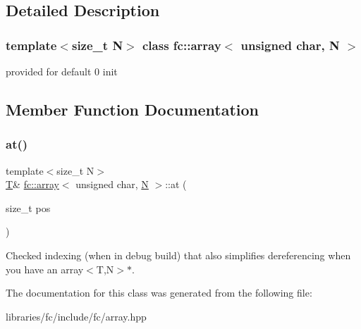 \subsection{Detailed Description}
\subsubsection*{template$<$size\+\_\+t N$>$\newline
class fc\+::array$<$ unsigned char, N $>$}

provided for default 0 init 

\subsection{Member Function Documentation}
\mbox{\label{classfc_1_1array_3_01unsigned_01char_00_01_n_01_4_ad86f8f8464a2c04c87fa1ea790e9f5db}} 
\subsubsection{\texorpdfstring{at()}{at()}}
{\footnotesize\ttfamily template$<$size\+\_\+t N$>$ \\
\mbox{\hyperlink{struct_t}{T}}\& \mbox{\hyperlink{classfc_1_1array}{fc\+::array}}$<$ unsigned char, \mbox{\hyperlink{group__types_gaf9c1edb0e0da55ec6ba09f32f6839529}{N}} $>$\+::at (\begin{DoxyParamCaption}\item[{size\+\_\+t}]{pos }\end{DoxyParamCaption})\hspace{0.3cm}{\ttfamily [inline]}}

Checked indexing (when in debug build) that also simplifies dereferencing when you have an array$<$\+T,\+N$>$$\ast$. 

The documentation for this class was generated from the following file\+:\begin{DoxyCompactItemize}
\item 
libraries/fc/include/fc/array.\+hpp\end{DoxyCompactItemize}
